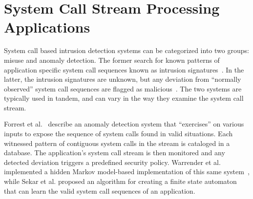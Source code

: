 %
%
\section{System Call Stream Processing Applications}

System call based intrusion detection systems
can be categorized into two groups: misuse and anomaly detection.
The former search for known patterns of application specific
system call
sequences known as intrusion signatures~\cite{GARCIATEODORO200918}.
In the latter, the intrusion signatures are unknown,
but any deviation
from ``normally observed'' system call sequences are flagged as
malicious~\cite{DBLP:conf/sp/ForrestHSL96}.
The two systems are typically used in tandem, and
can vary in the way they examine the system call stream.

Forrest et al.~\cite{DBLP:conf/sp/ForrestHSL96} describe
an anomaly detection system that
``exercises'' on various inputs to expose the
sequence of system calls found in valid situations.
Each witnessed pattern of contiguous system calls in the stream
is cataloged in a database.
The application's system call stream
is then monitored and any detected
deviation triggers a
predefined security policy.
Warrender et al. implemented a hidden Markov model-based implementation of this same system~\cite{DBLP:conf/sp/WarrenderFP99},
while
Sekar et al.\cite{DBLP:conf/sp/SekarBDB01} proposed
an algorithm
for creating a finite state automaton that can learn the valid system
call sequences of an application.


